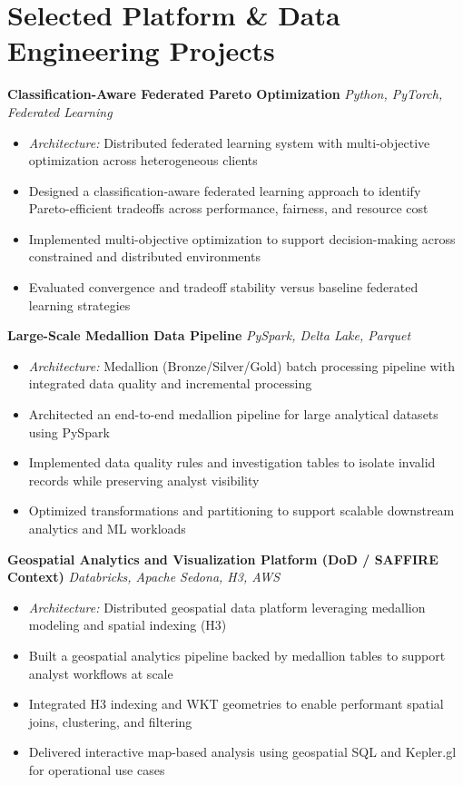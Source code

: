 \section{Selected Platform \& Data Engineering Projects}

\textbf{Classification-Aware Federated Pareto Optimization} \hfill {\small\textit{Python, PyTorch, Federated Learning}}
\begin{itemize}
	\item \textit{Architecture:} Distributed federated learning system with multi-objective optimization across heterogeneous clients
	\item Designed a classification-aware federated learning approach to identify Pareto-efficient tradeoffs across performance, fairness, and resource cost
	\item Implemented multi-objective optimization to support decision-making across constrained and distributed environments
	\item Evaluated convergence and tradeoff stability versus baseline federated learning strategies
\end{itemize}

\textbf{Large-Scale Medallion Data Pipeline} \hfill {\small\textit{PySpark, Delta Lake, Parquet}}
\begin{itemize}
	\item \textit{Architecture:} Medallion (Bronze/Silver/Gold) batch processing pipeline with integrated data quality and incremental processing
	\item Architected an end-to-end medallion pipeline for large analytical datasets using PySpark
	\item Implemented data quality rules and investigation tables to isolate invalid records while preserving analyst visibility
	\item Optimized transformations and partitioning to support scalable downstream analytics and ML workloads
\end{itemize}

\textbf{Geospatial Analytics and Visualization Platform (DoD / SAFFIRE Context)} \hfill {\small\textit{Databricks, Apache Sedona, H3, AWS}}
\begin{itemize}
	\item \textit{Architecture:} Distributed geospatial data platform leveraging medallion modeling and spatial indexing (H3)
	\item Built a geospatial analytics pipeline backed by medallion tables to support analyst workflows at scale
	\item Integrated H3 indexing and WKT geometries to enable performant spatial joins, clustering, and filtering
	\item Delivered interactive map-based analysis using geospatial SQL and Kepler.gl for operational use cases
\end{itemize}

